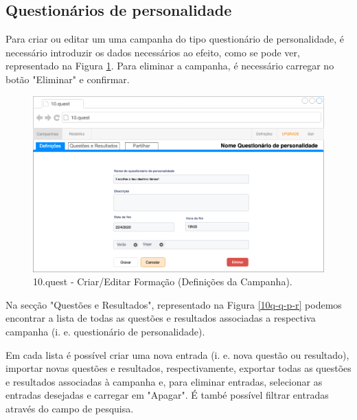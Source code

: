 \subsection{Questionários de personalidade}

Para criar ou editar um uma campanha do tipo questionário de personalidade, é necessário introduzir os dados necessários ao efeito, como se pode ver, representado na Figura \ref{10q-f-per}. Para eliminar a campanha, é necessário carregar no botão "Eliminar" e confirmar.

\begin{figure}[ht!]
	\begin{center}
		\includegraphics[width=1\textwidth]{img/prototipos/q-def.png}
		\caption{10.quest - Criar/Editar Formação (Definições da Campanha).}
		\label{10q-f-per}
	\end{center}
\end{figure}

Na secção "Questões e Resultados", representado na Figura \ref{10q-q-p-r} podemos encontrar a lista de todas as questões e resultados associadas a respectiva campanha (i. e. questionário de personalidade). 

Em cada lista é possível criar uma nova entrada (i. e. nova questão ou resultado), importar novas questões e resultados, respectivamente, exportar todas as questões e resultados associadas à campanha e, para eliminar entradas, selecionar as entradas desejadas e carregar em "Apagar". É també possível filtrar entradas através do campo de pesquisa.

